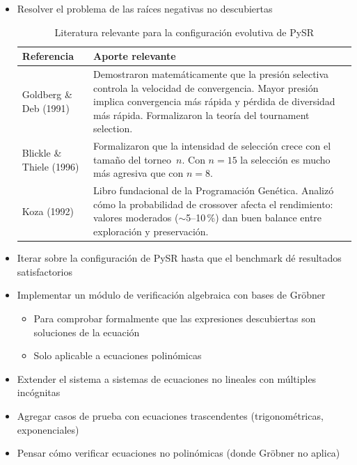 \documentclass[12pt, a4paper]{article}
\begin{document}
\begin{itemize}[leftmargin=1.5em]

  \item Resolver el problema de las raíces negativas no descubiertas

  \begin{table}[h]
\centering \small \caption{Literatura relevante para la configuración evolutiva de PySR} \label{tab:refs}
  \begin{tabular}{@{}p{4cm}p{10cm}@{}}
\toprule \textbf{Referencia} & \textbf{Aporte relevante} \\ \midrule Goldberg \& Deb (1991) & Demostraron matemáticamente que la presión selectiva controla la velocidad de convergencia. Mayor presión implica convergencia más rápida y pérdida de diversidad más rápida. Formalizaron la teoría del tournament selection. \\ \addlinespace Blickle \& Thiele (1996) & Formalizaron que la intensidad de selección crece con el tamaño del torneo~$n$. Con $n=15$ la selección es mucho más agresiva que con $n=8$. \\ \addlinespace Koza (1992) & Libro fundacional de la Programación Genética. Analizó cómo la probabilidad de crossover afecta el rendimiento: valores moderados ($\sim$5--10\,\%) dan buen balance entre exploración y preservación. \\ \bottomrule
  \end{tabular}
  \end{table}

  \item Iterar sobre la configuración de PySR hasta que el benchmark dé resultados satisfactorios

  \item Implementar un módulo de verificación algebraica con bases de Gröbner
  \begin{itemize}
\item Para comprobar formalmente que las expresiones descubiertas son soluciones de la ecuación \item Solo aplicable a ecuaciones polinómicas
  \end{itemize}

  \item Extender el sistema a sistemas de ecuaciones no lineales con múltiples incógnitas

  \item Agregar casos de prueba con ecuaciones trascendentes (trigonométricas, exponenciales)

  \item Pensar cómo verificar ecuaciones no polinómicas (donde Gröbner no aplica)

\end{itemize}
\end{document}

